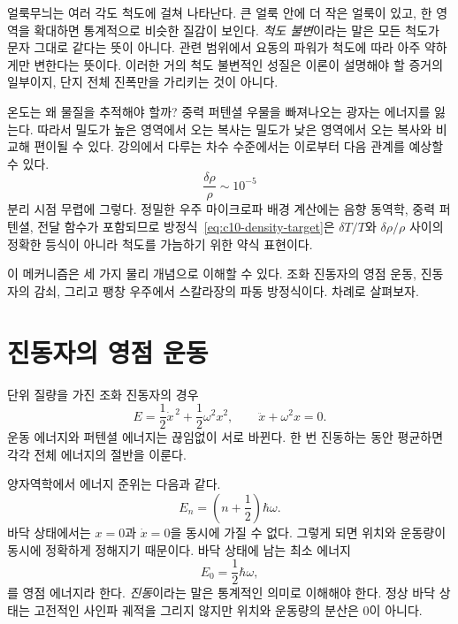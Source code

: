 얼룩무늬는 여러 각도 척도에 걸쳐 나타난다. 큰 얼룩 안에 더 작은 얼룩이 있고, 한 영역을 확대하면 통계적으로 비슷한 질감이 보인다. \emph{척도 불변}이라는 말은 모든 척도가 문자 그대로 같다는 뜻이 아니다. 관련 범위에서 요동의 파워가 척도에 따라 아주 약하게만 변한다는 뜻이다. 이러한 거의 척도 불변적인 성질은 이론이 설명해야 할 증거의 일부이지, 단지 전체 진폭만을 가리키는 것이 아니다.

온도는 왜 물질을 추적해야 할까? 중력 퍼텐셜 우물을 빠져나오는 광자는 에너지를 잃는다. 따라서 밀도가 높은 영역에서 오는 복사는 밀도가 낮은 영역에서 오는 복사와 비교해 편이될 수 있다. 강의에서 다루는 차수 수준에서는 이로부터 다음 관계를 예상할 수 있다.
\begin{equation}
\frac{\delta\rho}{\rho}\sim10^{-5}
\label{eq:c10-density-target}
\end{equation}
분리 시점 무렵에 그렇다. 정밀한 우주 마이크로파 배경 계산에는 음향 동역학, 중력 퍼텐셜, 전달 함수가 포함되므로 방정식~\eqref{eq:c10-density-target}은 \(\delta T/T\)와 \(\delta\rho/\rho\) 사이의 정확한 등식이 아니라 척도를 가늠하기 위한 약식 표현이다.

\begin{classroomqa}
\end{classroomqa}

이 메커니즘은 세 가지 물리 개념으로 이해할 수 있다. 조화 진동자의 영점 운동, 진동자의 감쇠, 그리고 팽창 우주에서 스칼라장의 파동 방정식이다. 차례로 살펴보자.

\section{진동자의 영점 운동}

단위 질량을 가진 조화 진동자의 경우
\begin{equation}
E=\frac12\dot x^{\,2}+\frac12\omega^2x^2,
\qquad
\ddot x+\omega^2x=0.
\label{eq:c10-undamped}
\end{equation}
운동 에너지와 퍼텐셜 에너지는 끊임없이 서로 바뀐다. 한 번 진동하는 동안 평균하면 각각 전체 에너지의 절반을 이룬다.

양자역학에서 에너지 준위는 다음과 같다.
\begin{equation}
E_n=\left(n+\frac12\right)\hbar\omega.
\label{eq:c10-oscillator-levels}
\end{equation}
바닥 상태에서는 \(x=0\)과 \(\dot x=0\)을 동시에 가질 수 없다. 그렇게 되면 위치와 운동량이 동시에 정확하게 정해지기 때문이다. 바닥 상태에 남는 최소 에너지
\[
E_0=\frac12\hbar\omega,
\]
를 영점 에너지라 한다. \emph{진동}이라는 말은 통계적인 의미로 이해해야 한다. 정상 바닥 상태는 고전적인 사인파 궤적을 그리지 않지만 위치와 운동량의 분산은 0이 아니다.

